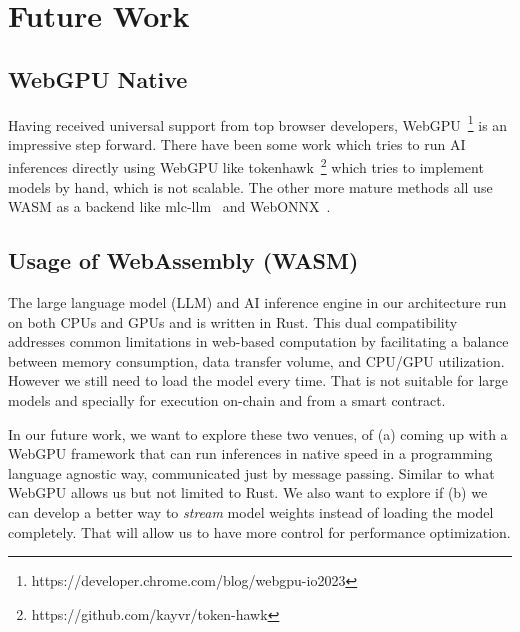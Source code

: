 \section{Future Work}

\subsection{WebGPU Native}

Having received universal support from top browser developers, WebGPU~\footnote{https://developer.chrome.com/blog/webgpu-io2023} is an impressive step forward. %
There have been some work which tries to run AI inferences directly using WebGPU like tokenhawk~\footnote{https://github.com/kayvr/token-hawk} which tries to implement models by hand, which is not scalable. The other more mature methods all use WASM as a backend like mlc-llm~\cite{MLCLLMHome-2024-01-18} and WebONNX~\cite{webonnx8}. 

\subsection{Usage of WebAssembly (WASM)}

The large language model (LLM) and AI inference engine in our architecture run on both CPUs and GPUs and is written in Rust. This dual compatibility addresses common limitations in web-based computation by facilitating a balance between memory consumption, data transfer volume, and CPU/GPU utilization. %
However we still need to load the model every time. That is not suitable for large models and specially for execution on-chain and from a smart contract. %

In our future work, we want to explore these two venues, of (a) coming up with a WebGPU framework that can run inferences in native speed in a programming language agnostic way, communicated just by message passing. Similar to what WebGPU allows us but not limited to Rust. We also want to explore if (b) we can develop a better way to \textit{stream} model weights instead of loading the model completely. That will allow us to have more control for performance optimization. %